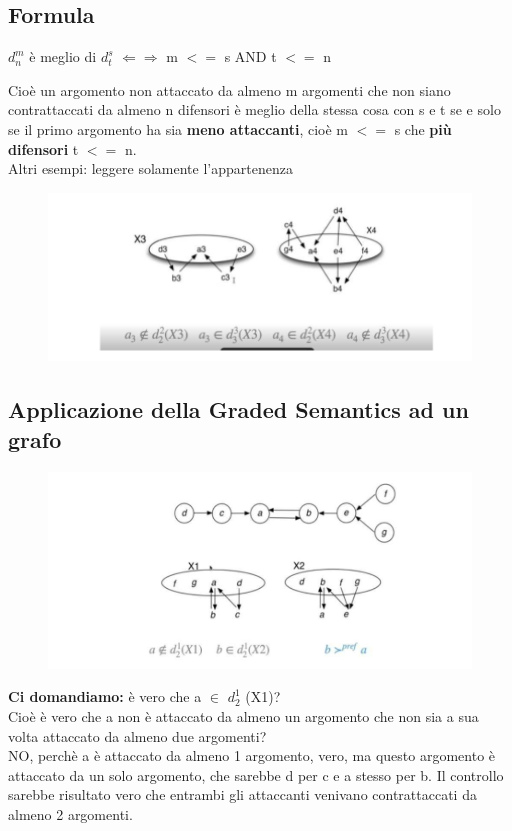 \subsection{Formula}
\begin{center}
    $d^m_n$ è meglio di $d^s_t$ $\Leftarrow \Rightarrow$ m $<=$ s AND t $<=$ n
\end{center}
Cioè un argomento non attaccato da almeno m argomenti che non siano contrattaccati da almeno n difensori è meglio della stessa cosa con s e t se e solo se il primo argomento ha sia \textbf{meno attaccanti}, cioè m $<=$ s che \textbf{più difensori} t $<=$ n.
\\Altri esempi: leggere solamente l’appartenenza
\begin{figure}[htp]
	\centering
    \includegraphics[width=13cm, keepaspectratio]{img/Cap8/defense2.png}
\end{figure}
\subsection{Applicazione della Graded Semantics ad un grafo}
\begin{figure}[htp]
	\centering
    \includegraphics[width=13cm, keepaspectratio]{img/Cap8/GdefnseGrafo.png}
\end{figure}
\textbf{Ci domandiamo:} è vero che a $\in$ $d^1_2$ (X1)? 
\\Cioè è vero che a non è attaccato da almeno un argomento che non sia a sua volta attaccato da almeno due argomenti? 
\\NO, perchè a è attaccato da almeno 1 argomento, vero, ma questo argomento è attaccato da un solo argomento, che sarebbe d per c e a stesso per b. Il controllo sarebbe risultato vero che entrambi gli attaccanti venivano contrattaccati da almeno 2 argomenti.

